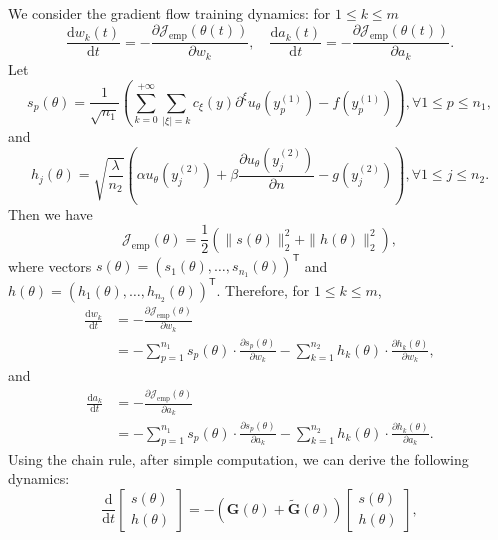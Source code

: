 \documentclass{article}
\renewcommand{\d}{\mathrm{d}}
\newcommand{\T}{\mathsf{T}}
\begin{document}
We consider the gradient flow training dynamics: for $1\le k\le m$
\begin{equation}
        \frac{\d w_k(t)}{\d t}=-\frac{\partial \mathcal{J}_{\text{emp}}(\theta(t))}{\partial w_k}, \quad \frac{\d a_k(t)}{\d t}=-\frac{\partial \mathcal{J}_{\text{emp}}(\theta(t))}{\partial a_k}.   \label{eq:gf_ntk}
\end{equation}
Let 
\begin{equation*}
    s_p(\theta)=\frac{1}{\sqrt{n_1}}\left(\sum_{k=0}^{+\infty} \sum_{|\xi|=k} c_{\xi}(y) \partial^\xi u_\theta\left(y_p^{(1)}\right) - f\left(y_p^{(1)}\right)\right) , \forall 1\le p\le n_1, 
\end{equation*}
and 
\begin{equation*}
    h_j(\theta)=\sqrt{\frac{\lambda}{n_2}}\left(\alpha u_\theta\left(y_j^{(2)}\right)+\beta \frac{\partial u_\theta\left(y_j^{(2)}\right)}{\partial n} - g\left(y_j^{(2)}\right)\right) , \forall 1\le j\le n_2.
\end{equation*}
Then we have
\begin{equation*}
    \mathcal{J}_{\text{emp}}(\theta)=\frac{1}{2}(\|s(\theta)\|_{2}^{2}+\|h(\theta)\|_{2}^{2}),
\end{equation*}
where vectors $s(\theta)=(s_{1}(\theta), \ldots, s_{n_1}(\theta))^\T$ and $h(\theta)=(h_{1}(\theta), \ldots, h_{n_2}(\theta))^\T$. 
Therefore, for $1\le k\le m$, 
\begin{align*}
\frac{\d w_k}{\d t} &= - \frac{\partial \mathcal{J}_{\text{emp}}(\theta)}{\partial w_k} \\
&= - \sum_{p=1}^{n_1} s_p(\theta) \cdot \frac{\partial s_p(\theta)}{\partial w_k}
    - \sum_{k=1}^{n_2} h_k(\theta) \cdot \frac{\partial h_k(\theta)}{\partial w_k},
\end{align*}
and
\begin{align*}
\frac{\d a_k}{\d t} &= -\frac{\partial \mathcal{J}_{\text{emp}}(\theta)}{\partial a_k} \\
&= - \sum_{p=1}^{n_1} s_p(\theta) \cdot \frac{\partial s_p(\theta)}{\partial a_k}
   - \sum_{k=1}^{n_2} h_k(\theta) \cdot \frac{\partial h_k(\theta)}{\partial a_k} .
\end{align*}
Using the chain rule, after simple computation, we can derive the following dynamics:
\begin{equation}
\frac{\d}{\d t}
\begin{bmatrix}
s(\theta) \\
h(\theta)
\end{bmatrix}
= -\left( \mathbf{G}(\theta) + \widetilde{\mathbf{G}}(\theta) \right)
\begin{bmatrix}
s(\theta) \\
h(\theta)
\end{bmatrix},
\end{equation}
\end{document}
